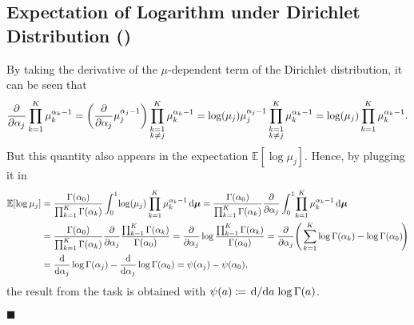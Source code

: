 \documentclass[11pt, a4paper]{scrartcl}
\newcommand{\E}{\mathbb{E}}
\renewcommand{\vec}[1]{\bm{#1}}
\newcommand{\eot}{\hfill\(\blacksquare\)}
\newcommand{\diffstar}{\texorpdfstring{\raisebox{-1pt}{\resizebox{!}{8pt}{\(\star\)}}}{*}}
\newcommand{\onestar}  {(\diffstar)}
\begin{document}
		\subsection{Expectation of Logarithm under Dirichlet Distribution  \onestar}
			By taking the derivative of the \(\mu\)-dependent term of the Dirichlet distribution, it can be seen that
			\begin{equation}
				\pdv{\alpha_j} \prod_{k = 1}^{K} \mu_k^{\alpha_k - 1}
					= \bigg( \pdv{\alpha_j} \mu_j^{\alpha_j - 1} \bigg) \prod_{\substack{k = 1 \\ k \neq j}}^{K} \mu_k^{\alpha_k - 1}
					= \log(\mu_j) \mu_j^{\alpha_j - 1} \prod_{\substack{k = 1 \\ k \neq j}}^{K} \mu_k^{\alpha_k - 1}
					= \log(\mu_j) \prod_{k = 1}^{K} \mu_k^{\alpha_k - 1}.
			\end{equation}
			But this quantity also appears in the expectation \( \E[\log \mu_j] \). Hence, by plugging it in
			\begin{align}
				\E[\log \mu_j]
					&= \frac{\Gamma(\alpha_0)}{\prod_{k = 1}^{K} \Gamma(\alpha_k)} \int_{0}^{1}\! \log(\mu_j) \prod_{k = 1}^{K} \mu_k^{\alpha_k - 1} \dd{\vec{\mu}}
					 = \frac{\Gamma(\alpha_0)}{\prod_{k = 1}^{K} \Gamma(\alpha_k)} \pdv{\alpha_j} \int_{0}^{1}\! \prod_{k = 1}^{K} \mu_k^{\alpha_k - 1} \dd{\vec{\mu}} \\
					&= \frac{\Gamma(\alpha_0)}{\prod_{k = 1}^{K} \Gamma(\alpha_k)} \pdv{\alpha_j} \frac{\prod_{k = 1}^{K} \Gamma(\alpha_k)}{\Gamma(\alpha_0)}
					 = \pdv{\alpha_j} \log \frac{\prod_{k = 1}^{K} \Gamma(\alpha_k)}{\Gamma(\alpha_0)}
					 = \pdv{\alpha_j} \Bigg( \sum_{k = 1}^{K} \log \Gamma(\alpha_k) - \log \Gamma(\alpha_0) \!\Bigg) \\
					&= \dv{\alpha_j} \log \Gamma(\alpha_j) - \dv{\alpha_j} \log \Gamma(\alpha_0)
					 = \psi(\alpha_j) - \psi(\alpha_0),
			\end{align}
			the result from the task is obtained with \(\psi(a) \coloneqq \dv*{a} \log \Gamma(a) \).

			\eot
\end{document}
